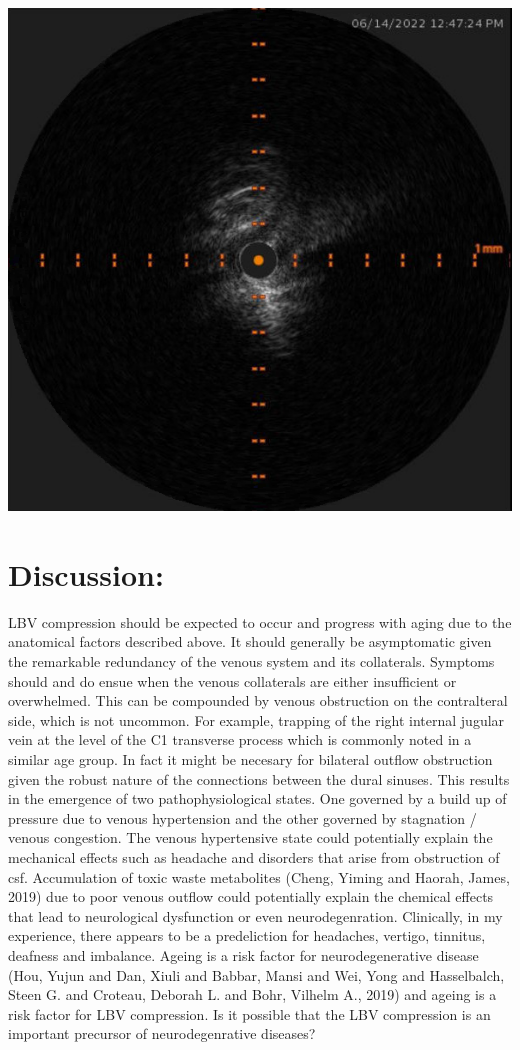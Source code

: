 \documentclass{article}
\begin{document}
\begin{center}
\includegraphics[width=.9\linewidth]{./images/LBV-Compression.png}
\end{center}



\section*{Discussion:}
\label{sec:orgd0b82ee}
LBV compression should be expected to occur and progress with aging due to the anatomical factors described above.
It should generally be asymptomatic given the remarkable redundancy of the venous system and its collaterals.
Symptoms should and do ensue when the venous collaterals are either insufficient or overwhelmed.
This can be compounded by venous obstruction on the contralteral side, which is not uncommon.
For example, trapping of the right internal jugular vein at the level of the C1 transverse process which is commonly noted in a similar age group.
In fact it might be necesary for bilateral outflow obstruction given the robust nature of the connections between the dural sinuses.
This results in the emergence of two pathophysiological states.
One governed by a build up of pressure due to venous hypertension and the other governed by stagnation / venous congestion.
The venous hypertensive state could potentially explain the mechanical effects such as headache and disorders that arise from obstruction of csf.
Accumulation of toxic waste metabolites (Cheng, Yiming and Haorah, James, 2019) due to poor venous outflow could potentially explain the chemical effects that lead to neurological dysfunction or even neurodegenration.
Clinically, in my experience, there appears to be a predeliction for headaches, vertigo, tinnitus, deafness and imbalance.
Ageing is a risk factor for neurodegenerative disease (Hou, Yujun and Dan, Xiuli and Babbar, Mansi and Wei, Yong and Hasselbalch, Steen G. and Croteau, Deborah L. and Bohr, Vilhelm A., 2019) and ageing is a risk factor for LBV compression.
Is it possible that the LBV compression is an important precursor of neurodegenrative diseases?
\end{document}
